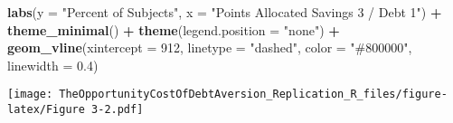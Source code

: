 \documentclass[
]{article}
\newenvironment{Shaded}{\begin{snugshade}}{\end{snugshade}}
\newcommand{\AttributeTok}[1]{\textcolor[rgb]{0.13,0.29,0.53}{#1}}
\newcommand{\DecValTok}[1]{\textcolor[rgb]{0.00,0.00,0.81}{#1}}
\newcommand{\FloatTok}[1]{\textcolor[rgb]{0.00,0.00,0.81}{#1}}
\newcommand{\FunctionTok}[1]{\textcolor[rgb]{0.13,0.29,0.53}{\textbf{#1}}}
\newcommand{\NormalTok}[1]{#1}
\newcommand{\SpecialCharTok}[1]{\textcolor[rgb]{0.81,0.36,0.00}{\textbf{#1}}}
\newcommand{\StringTok}[1]{\textcolor[rgb]{0.31,0.60,0.02}{#1}}
\begin{document}
\begin{Shaded}
\begin{Highlighting}[]
  \FunctionTok{labs}\NormalTok{(}\AttributeTok{y =} \StringTok{"Percent of Subjects"}\NormalTok{, }\AttributeTok{x =} \StringTok{"Points Allocated Savings 3 / Debt 1"}\NormalTok{) }\SpecialCharTok{+}
  \FunctionTok{theme\_minimal}\NormalTok{() }\SpecialCharTok{+}
  \FunctionTok{theme}\NormalTok{(}\AttributeTok{legend.position =} \StringTok{"none"}\NormalTok{) }\SpecialCharTok{+}
  \FunctionTok{geom\_vline}\NormalTok{(}\AttributeTok{xintercept =} \DecValTok{912}\NormalTok{, }\AttributeTok{linetype =} \StringTok{"dashed"}\NormalTok{, }\AttributeTok{color =} \StringTok{"\#800000"}\NormalTok{, }\AttributeTok{linewidth =} \FloatTok{0.4}\NormalTok{)}
\end{Highlighting}
\end{Shaded}

\texttt{[image: TheOpportunityCostOfDebtAversion\_Replication\_R\_files/figure-latex/Figure 3-2.pdf]}
\end{document}
